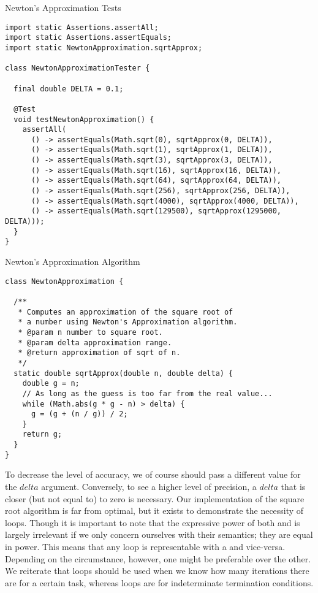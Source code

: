 \begin{cl}{Newton's Approximation Tests}
\begin{lstlisting}[language=MyJava]
import static Assertions.assertAll;
import static Assertions.assertEquals;
import static NewtonApproximation.sqrtApprox;

class NewtonApproximationTester {

  final double DELTA = 0.1;

  @Test
  void testNewtonApproximation() {
    assertAll(
      () -> assertEquals(Math.sqrt(0), sqrtApprox(0, DELTA)),
      () -> assertEquals(Math.sqrt(1), sqrtApprox(1, DELTA)),
      () -> assertEquals(Math.sqrt(3), sqrtApprox(3, DELTA)),
      () -> assertEquals(Math.sqrt(16), sqrtApprox(16, DELTA)),
      () -> assertEquals(Math.sqrt(64), sqrtApprox(64, DELTA)),
      () -> assertEquals(Math.sqrt(256), sqrtApprox(256, DELTA)),
      () -> assertEquals(Math.sqrt(4000), sqrtApprox(4000, DELTA)),
      () -> assertEquals(Math.sqrt(129500), sqrtApprox(1295000, DELTA)));
  }
}
\end{lstlisting}
\end{cl}

\begin{cl}{Newton's Approximation Algorithm}
\begin{lstlisting}[language=MyJava]
class NewtonApproximation {

  /**
   * Computes an approximation of the square root of
   * a number using Newton's Approximation algorithm.
   * @param n number to square root.
   * @param delta approximation range.
   * @return approximation of sqrt of n.
   */
  static double sqrtApprox(double n, double delta) {
    double g = n;
    // As long as the guess is too far from the real value...
    while (Math.abs(g * g - n) > delta) {
      g = (g + (n / g)) / 2;
    }
    return g;
  }
}
\end{lstlisting}
\end{cl}

To decrease the level of accuracy, we of course should pass a different value for the $\mathit{delta}$ argument. Conversely, to see a higher level of precision, a $\mathit{delta}$ that is closer (but not equal to) to zero is necessary. Our implementation of the square root algorithm is far from optimal, but it exists to demonstrate the necessity of  loops. Though it is important to note that the expressive power of both  and  is largely irrelevant if we only concern ourselves with their semantics; they are equal in power. This means that any  loop is representable with a  and vice-versa. Depending on the circumstance, however, one might be preferable over the other. We reiterate that  loops should be used when we know how many iterations there are for a certain task, whereas  loops are for indeterminate termination conditions. 

